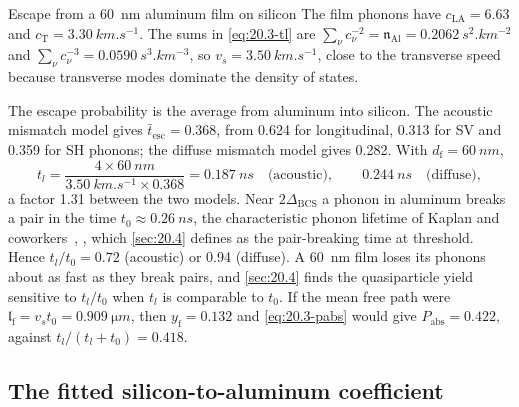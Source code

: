 \begin{workedexample}{Escape from a \SI{60}{nm} aluminum film on silicon}\label{we:20-escape}
The film phonons have $c_{\mathrm{LA}} = 6.63$ and $c_{\mathrm{T}} = \SI{3.30}{km.s^{-1}}$. The sums in \cref{eq:20.3-tl} are $\sum_\nu c_\nu^{-2} = \mathfrak{n}_{\mathrm{Al}} = \SI{0.2062}{s^2.km^{-2}}$ and $\sum_\nu c_\nu^{-3} = \SI{0.0590}{s^3.km^{-3}}$, so $v_s = \SI{3.50}{km.s^{-1}}$, close to the transverse speed because transverse modes dominate the density of states.

The escape probability is the average from aluminum into silicon. The acoustic mismatch model gives $\bar t_{\mathrm{esc}} = 0.368$, from 0.624 for longitudinal, 0.313 for SV and 0.359 for SH phonons; the diffuse mismatch model gives 0.282. With $d_{\mathrm{f}} = \SI{60}{nm}$,
\begin{equation*}
  t_l = \frac{4\times\SI{60}{nm}}{\SI{3.50}{km.s^{-1}}\times0.368} = \SI{0.187}{ns} \quad\text{(acoustic)}, \qquad \SI{0.244}{ns} \quad\text{(diffuse)},
\end{equation*}
a factor 1.31 between the two models. Near $2\Delta_{\mathrm{BCS}}$ a phonon in aluminum breaks a pair in the time $t_0 \approx \SI{0.26}{ns}$, the characteristic phonon lifetime of Kaplan and coworkers~\cite{kaplan1976quasiparticle}, \cite[p.~2]{guruswamy2014quasiparticle}, which \cref{sec:20.4} defines as the pair-breaking time at threshold. Hence $t_l/t_0 = 0.72$ (acoustic) or 0.94 (diffuse). A \SI{60}{nm} film loses its phonons about as fast as they break pairs, and \cref{sec:20.4} finds the quasiparticle yield sensitive to $t_l/t_0$ when $t_l$ is comparable to $t_0$. If the mean free path were $\mathfrak{l}_{\mathrm{f}} = v_st_0 = \SI{0.909}{\micro m}$, then $y_{\mathrm{f}} = 0.132$ and \cref{eq:20.3-pabs} would give $P_{\mathrm{abs}} = 0.422$, against $t_l/(t_l + t_0) = 0.418$.
\end{workedexample}

\subsection{The fitted silicon-to-aluminum coefficient}\label{sec:20.3-fit}

